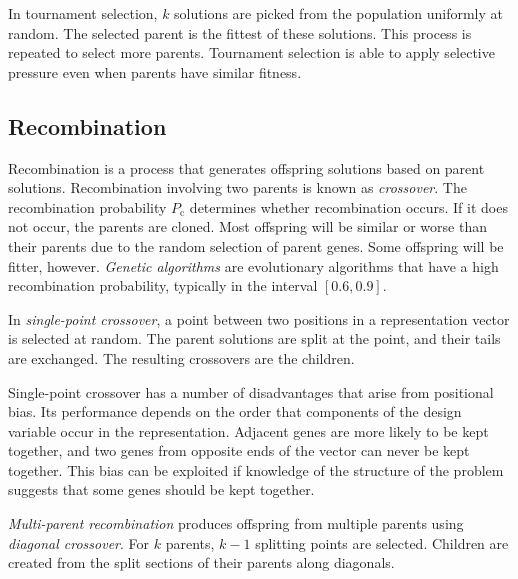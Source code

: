In tournament selection, \( k \) solutions are picked from the population uniformly at random.
The selected parent is the fittest of these solutions.
This process is repeated to select more parents.
Tournament selection is able to apply selective pressure even when parents have similar fitness.

\subsection{Recombination}

Recombination is a process that generates offspring solutions based on parent solutions.
Recombination involving two parents is known as \emph{crossover}.
The recombination probability \( P_{\mathrm{c}} \) determines whether recombination occurs.
If it does not occur, the parents are cloned.
Most offspring will be similar or worse than their parents due to the random selection of parent genes.
Some offspring will be fitter, however.
\emph{Genetic algorithms} are evolutionary algorithms that have a high recombination probability, typically in the interval \( \left[ 0.6, 0.9 \right] \).

In \emph{single-point crossover}, a point between two positions in a representation vector is selected at random.
The parent solutions are split at the point, and their tails are exchanged.
The resulting crossovers are the children.

Single-point crossover has a number of disadvantages that arise from positional bias.
Its performance depends on the order that components of the design variable occur in the representation.
Adjacent genes are more likely to be kept together, and two genes from opposite ends of the vector can never be kept together.
This bias can be exploited if knowledge of the structure of the problem suggests that some genes should be kept together.

\emph{Multi-parent recombination} produces offspring from multiple parents using \emph{diagonal crossover}.
For \( k \) parents, \( k - 1 \) splitting points are selected.
Children are created from the split sections of their parents along diagonals.

